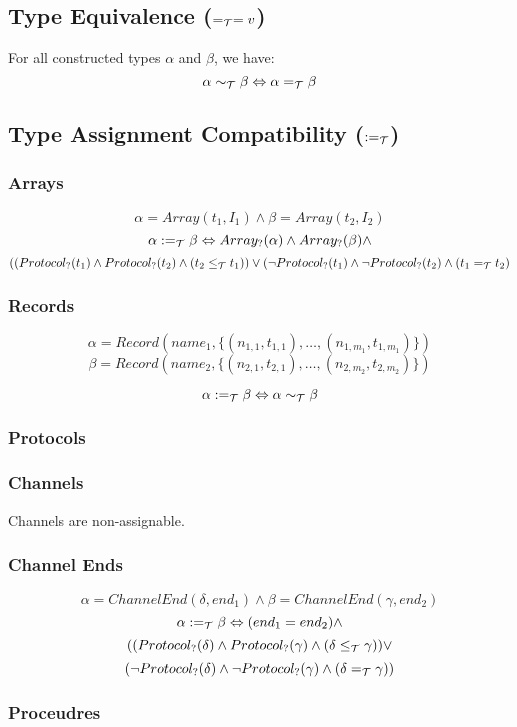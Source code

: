 \documentclass[]{article}
\begin{document}
\subsection{Type Equivalence ($=_{\cal T}=v$)}

For all constructed types $\alpha$ and $\beta$, we have:
\[
\alpha \sim_{\cal T} \beta \Leftrightarrow \alpha =_{\cal T} \beta
\]

\subsection{Type Assignment Compatibility ($:=_{\cal T}$)}

\subsubsection{Arrays}

\[
\alpha = Array(t_1, I_1) \wedge \beta =  Array(t_2, I_2)
\]
\[
\alpha :=_{\cal T} \beta \Leftrightarrow Array_?(\alpha) \wedge Array_?(\beta) \wedge
\]
\[
((Protocol_?(t_1) \wedge Protocol_?(t_2) \wedge (t_2 \leq_{\cal T} t_1)) \vee
(\neg{}Protocol_?(t_1) \wedge \neg{}Protocol_?(t_2) \wedge (t_1 =_{\cal T} t_2)
\]
\subsubsection{Records}

\[
\alpha = Record(name_1, \{(n_{1,1},t_{1,1}),\ldots,(n_{1,m_1}, t_{1,m_1})\})
\]
\[
\beta = Record(name_2, \{(n_{2,1},t_{2,1}),\ldots,(n_{2,m_2}, t_{2,m_2})\})
\]

\[
\alpha :=_{\cal T} \beta \Leftrightarrow \alpha \sim_{\cal T} \beta
\]
\subsubsection{Protocols}



\subsubsection{Channels}

Channels are non-assignable.

\subsubsection{Channel Ends}

\[
\alpha = ChannelEnd(\delta, end_1) \wedge \beta = ChannelEnd(\gamma, end_2)
\]
\[
\alpha :=_{\cal T} \beta \Leftrightarrow (end_1 = end_2) \wedge
\]
\[
 ((Protocol_?(\delta) \wedge Protocol_?(\gamma) \wedge (\delta \leq_{\cal T} \gamma)) \vee
\]
\[
(\neg{}Protocol_?(\delta) \wedge \neg{}Protocol_?(\gamma) \wedge (\delta =_{\cal T} \gamma))
\]


\subsubsection{Proceudres}
\end{document}
